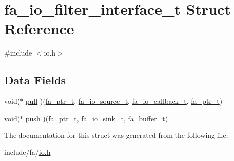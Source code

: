 \hypertarget{structfa__io__filter__interface__t}{\section{fa\-\_\-io\-\_\-filter\-\_\-interface\-\_\-t Struct Reference}
\label{structfa__io__filter__interface__t}
}


{\ttfamily \#include $<$io.\-h$>$}

\subsection*{Data Fields}
\begin{DoxyCompactItemize}
\item 
void($\ast$ \hyperlink{group___fa_ga4c1b53d5564e5a27036713bc280f63be}{pull} )(\hyperlink{group___fa_ga915ddeae99ad7568b273d2b876425197}{fa\-\_\-ptr\-\_\-t}, \hyperlink{group___fa_io_ga95a53a87c83414434e1afd3097b96ea4}{fa\-\_\-io\-\_\-source\-\_\-t}, \hyperlink{group___fa_io_gaa151f2c484756349795513fdf67a0268}{fa\-\_\-io\-\_\-callback\-\_\-t}, \hyperlink{group___fa_ga915ddeae99ad7568b273d2b876425197}{fa\-\_\-ptr\-\_\-t})
\item 
void($\ast$ \hyperlink{group___fa_ga45f859f2c9de90bf2660c8a4aa1e6f29}{push} )(\hyperlink{group___fa_ga915ddeae99ad7568b273d2b876425197}{fa\-\_\-ptr\-\_\-t}, \hyperlink{group___fa_io_ga0d00d1e2c742abdba97597662815ce3a}{fa\-\_\-io\-\_\-sink\-\_\-t}, \hyperlink{group___fa_buffer_ga0ed7a1d783ab322e2e8be02432d0839e}{fa\-\_\-buffer\-\_\-t})
\end{DoxyCompactItemize}


The documentation for this struct was generated from the following file\-:\begin{DoxyCompactItemize}
\item 
include/fa/\hyperlink{io_8h}{io.\-h}\end{DoxyCompactItemize}
